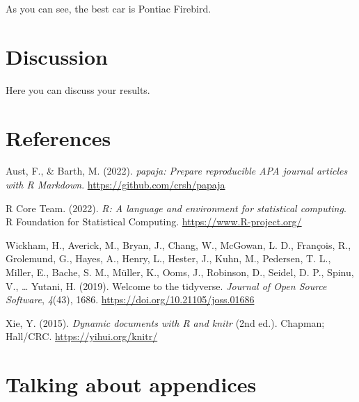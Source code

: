 \documentclass[
  man,floatsintext]{apa7}
\newlength{\cslhangindent}
\newlength{\cslentryspacingunit} %
\newenvironment{CSLReferences}[2] %
 {%
  \setlength{\parindent}{0pt}
  \ifodd #1
  \let\oldpar\par
  \def\par{\hangindent=\cslhangindent\oldpar}
  \fi
  \setlength{\parskip}{#2\cslentryspacingunit}
 }%
 {}
\begin{document}
As you can see, the best car is Pontiac Firebird.

\hypertarget{discussion}{%
\section{Discussion}\label{discussion}}

Here you can discuss your results.

\newpage

\hypertarget{references}{%
\section{References}\label{references}}

\hypertarget{refs}{}
\begin{CSLReferences}{1}{0}
\leavevmode{}%
Aust, F., \& Barth, M. (2022). \emph{{papaja}: {Prepare} reproducible {APA} journal articles with {R Markdown}}. \url{https://github.com/crsh/papaja}

\leavevmode{}%
R Core Team. (2022). \emph{R: A language and environment for statistical computing}. R Foundation for Statistical Computing. \url{https://www.R-project.org/}

\leavevmode{}%
Wickham, H., Averick, M., Bryan, J., Chang, W., McGowan, L. D., François, R., Grolemund, G., Hayes, A., Henry, L., Hester, J., Kuhn, M., Pedersen, T. L., Miller, E., Bache, S. M., Müller, K., Ooms, J., Robinson, D., Seidel, D. P., Spinu, V., \ldots{} Yutani, H. (2019). Welcome to the {tidyverse}. \emph{Journal of Open Source Software}, \emph{4}(43), 1686. \url{https://doi.org/10.21105/joss.01686}

\leavevmode{}%
Xie, Y. (2015). \emph{Dynamic documents with {R} and knitr} (2nd ed.). Chapman; Hall/CRC. \url{https://yihui.org/knitr/}

\end{CSLReferences}

\newpage

\hypertarget{appendix-appendix}{%
\appendix}


\hypertarget{talking-about-appendices}{%
\section{Talking about appendices}\label{talking-about-appendices}}
\end{document}
